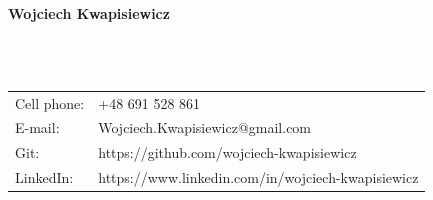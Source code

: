 \documentclass[a4paper,10pt]{article}
\begin{document}
\begin{LARGE} 
	\textbf{Wojciech Kwapisiewicz}
\end{LARGE}\\
\\
\begin{tabular}{p{}|p{}}
	Cell phone: & +48 691 528 861                  \\
	E-mail:     & Wojciech.Kwapisiewicz@gmail.com\\
	Git:    & https://github.com/wojciech-kwapisiewicz \\
	LinkedIn: & https://www.linkedin.com/in/wojciech-kwapisiewicz
\end{tabular}\\

\\
\\

\\
\\

\\
\\

\\
\\

\\
\\

\end{document}
